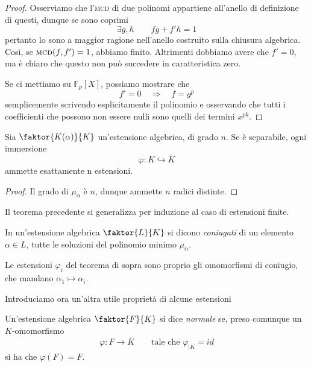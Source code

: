 \begin{multicols}{2}
\begin{proof}
	Osserviamo che l'\textsc{mcd} di due polinomi appartiene all'anello di definizione di questi, dunque se sono coprimi
	\[ \exists g, h  \qquad fg +f'h = 1 \]
	pertanto lo sono a maggior ragione nell'anello costruito sulla chiusura algebrica. Così, se $  \textsc{mcd}(f, f') = 1  $, abbiamo finito. Altrimenti dobbiamo avere che $ f'=0 $, ma è chiaro che questo non può succedere in caratteristica zero.
	
	Se ci mettiamo su $ \mathbb{F}_p[X] $, possiamo mostrare che
	\[ f' = 0 \quad\Rightarrow\quad f = g^p \]
	semplicemente scrivendo esplicitamente il polinomio e osservando che tutti i coefficienti che possono non essere nulli sono quelli dei termini $ x^{pk} $.
\end{proof}

\begin{theorem}
	Sia $ \faktor{K(\alpha)}{K} $ un'estensione algebrica, di grado $ n $. Se è separabile, ogni immersione
	\[ \varphi: K \hookrightarrow \bar{K} \]
	ammette esattamente n estensioni.
\end{theorem}
\begin{proof}
	Il grado di $ \mu_\alpha $ è $ n $, dunque ammette $ n $ radici distinte.
\end{proof}
\begin{remark}
	Il teorema precedente si generalizza per induzione al caso di estensioni finite.
\end{remark}

\begin{definition}
	In un'estensione algebrica $ \faktor{L}{K} $ si dicono \emph{coniugati} di un elemento $ \alpha \in L $, tutte le soluzioni del polinomio minimo $ \mu_\alpha $.
\end{definition}

\begin{remark}
	Le estensioni $ \varphi_i $ del teorema di sopra sono proprio gli omomorfismi di coniugio, che mandano $ \alpha_1 \mapsto \alpha_i $.
\end{remark}



Introduciamo ora un'altra utile proprietà di alcune estensioni

\begin{definition}[Normalità]
	Un'estensione algebrica $ \faktor{F}{K} $ si dice \emph{normale} se, preso comunque un $ K $-omomorfismo
	\[ \varphi \colon F \to \bar{K} \qquad\text{tale che } \varphi_{|K} = id \]
	si ha che $ \varphi(F) = F $.
\end{definition}


\end{multicols}
